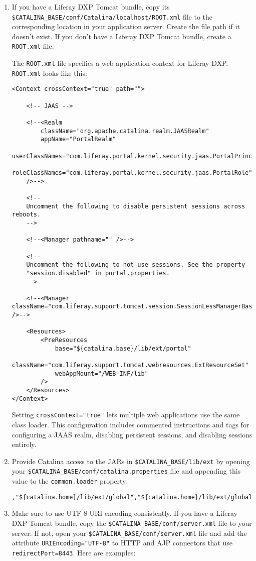 \begin{enumerate}
\def\labelenumi{\arabic{enumi}.}
\setcounter{enumi}{1}
\item
  If you have a Liferay DXP Tomcat bundle, copy its
  \texttt{\$CATALINA\_BASE/conf/Catalina/localhost/ROOT.xml} file to the
  corresponding location in your application server. Create the file
  path if it doesn't exist. If you don't have a Liferay DXP Tomcat
  bundle, create a \texttt{ROOT.xml} file.

  The \texttt{ROOT.xml} file specifies a web application context for
  Liferay DXP. \texttt{ROOT.xml} looks like this:

\begin{verbatim}
<Context crossContext="true" path="">

    <!-- JAAS -->

    <!--<Realm
        className="org.apache.catalina.realm.JAASRealm"
        appName="PortalRealm"
        userClassNames="com.liferay.portal.kernel.security.jaas.PortalPrincipal"
        roleClassNames="com.liferay.portal.kernel.security.jaas.PortalRole"
    />-->

    <!--
    Uncomment the following to disable persistent sessions across reboots.
    -->

    <!--<Manager pathname="" />-->

    <!--
    Uncomment the following to not use sessions. See the property
    "session.disabled" in portal.properties.
    -->

    <!--<Manager className="com.liferay.support.tomcat.session.SessionLessManagerBase" />-->

    <Resources>
        <PreResources
            base="${catalina.base}/lib/ext/portal"
            className="com.liferay.support.tomcat.webresources.ExtResourceSet"
            webAppMount="/WEB-INF/lib"
        />
    </Resources>
</Context>
\end{verbatim}

  Setting \texttt{crossContext="true"} lets multiple web applications
  use the same class loader. This configuration includes commented
  instructions and tags for configuring a JAAS realm, disabling
  persistent sessions, and disabling sessions entirely.
\item
  Provide Catalina access to the JARs in
  \texttt{\$CATALINA\_BASE/lib/ext} by opening your
  \texttt{\$CATALINA\_BASE/conf/catalina.properties} file and appending
  this value to the \texttt{common.loader} property:

\begin{verbatim}
,"${catalina.home}/lib/ext/global","${catalina.home}/lib/ext/global/*.jar","${catalina.home}/lib/ext","${catalina.home}/lib/ext/*.jar"
\end{verbatim}
\item
  Make sure to use UTF-8 URI encoding consistently. If you have a
  Liferay DXP Tomcat bundle, copy the
  \texttt{\$CATALINA\_BASE/conf/server.xml} file to your server. If not,
  open your \texttt{\$CATALINA\_BASE/conf/server.xml} file and add the
  attribute \texttt{URIEncoding="UTF-8"} to HTTP and AJP connectors that
  use \texttt{redirectPort=8443}. Here are examples:


\end{enumerate}
